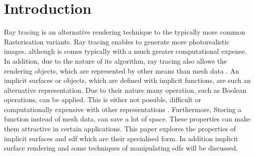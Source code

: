 


\section{Introduction}
\label{section:Introduction}

Ray tracing is an alternative rendering technique to the typically more common Rasterisation variants. Ray tracing enables to generate more photorealistic images, although is comes typically with a much greater computational expense. In addition, due to the nature of its algorithm, ray tracing also allows the rendering objects, which are represented by other means than mesh data \cite{bungartz:2013:einfuhrung}. An implicit surfaces or objects, which are defined with implicit functions, are such an alternative representation. Due to their nature many operation, such as Boolean operations, can be applied. This is either not possible, difficult or computationally expensive with other representations  \cite{osher:2006:level, quilez:2008:distfunctions}. Furthermore, Storing a function instead of mesh data, can save a lot of space. These properties can make them attractive in certain applications. This paper explores the properties of implicit surfaces and \gls{sdf} which are their specialised form. In addition implicit surface rendering and some techniques of manipulating \glspl{sdf} will be discussed.
